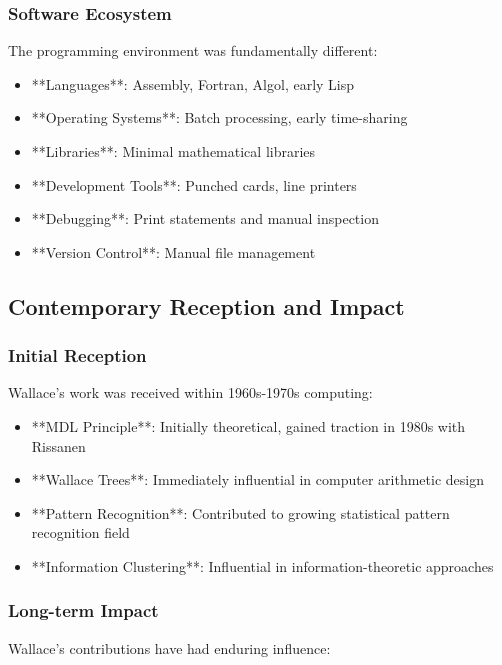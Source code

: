 \subsubsection{Software Ecosystem}

The programming environment was fundamentally different:

\begin{itemize}
    \item **Languages**: Assembly, Fortran, Algol, early Lisp
    \item **Operating Systems**: Batch processing, early time-sharing
    \item **Libraries**: Minimal mathematical libraries
    \item **Development Tools**: Punched cards, line printers
    \item **Debugging**: Print statements and manual inspection
    \item **Version Control**: Manual file management
\end{itemize}

\subsection{Contemporary Reception and Impact}

\subsubsection{Initial Reception}

Wallace's work was received within 1960s-1970s computing:

\begin{itemize}
    \item **MDL Principle**: Initially theoretical, gained traction in 1980s with Rissanen
    \item **Wallace Trees**: Immediately influential in computer arithmetic design
    \item **Pattern Recognition**: Contributed to growing statistical pattern recognition field
    \item **Information Clustering**: Influential in information-theoretic approaches
\end{itemize}

\subsubsection{Long-term Impact}

Wallace's contributions have had enduring influence:


